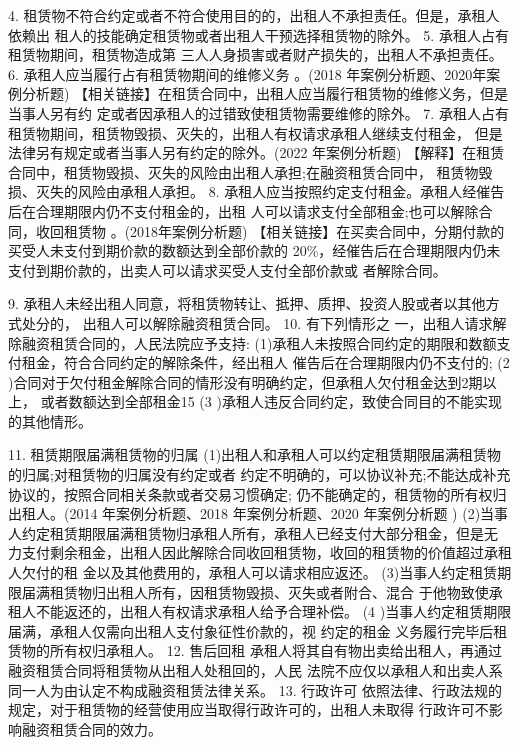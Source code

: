 \documentclass[UTF8,12pt]{ctexart}
\numberwithin{equation}{section} %
\numberwithin{figure}{section}
\numberwithin{table}{section}
\begin{document}
	4. 租赁物不符合约定或者不符合使用目的的，出租人不承担责任。但是，承租人依赖出 租人的技能确定租赁物或者出租人干预选择租赁物的除外。
	5. 承租人占有租赁物期间，租赁物造成第 三人人身损害或者财产损失的，出租人不承担责任。 6. 承租人应当履行占有租赁物期间的维修义务 。(2018 年案例分析题、2020年案例分析题)
	【相关链接】在租赁合同中，出租人应当履行租赁物的维修义务，但是当事人另有约 定或者因承租人的过错致使租赁物需要维修的除外。
	7. 承租人占有租赁物期间，租赁物毁损、灭失的，出租人有权请求承租人继续支付租金， 但是法律另有规定或者当事人另有约定的除外。(2022 年案例分析题)
	【解释】在租赁合同中，租赁物毁损、灭失的风险由出租人承担;在融资租赁合同中， 租赁物毁损、灭失的风险由承租人承担。
	8. 承租人应当按照约定支付租金。承租人经催告后在合理期限内仍不支付租金的，出租 人可以请求支付全部租金;也可以解除合同，收回租赁物 。(2018年案例分析题)
	【相关链接】在买卖合同中，分期付款的买受人未支付到期价款的数额达到全部价款的 20\%，经催告后在合理期限内仍未支付到期价款的，出卖人可以请求买受人支付全部价款或 者解除合同。
	
	9. 承租人未经出租人同意，将租赁物转让、抵押、质押、投资人股或者以其他方式处分的， 出租人可以解除融资租赁合同。
	10. 有下列情形之 一，出租人请求解除融资租赁合同的，人民法院应予支持: (1)承租人未按照合同约定的期限和数额支付租金，符合合同约定的解除条件，经出租人 催告后在合理期限内仍不支付的;
	(2 )合同对于欠付租金解除合同的情形没有明确约定，但承租人欠付租金达到2期以上， 或者数额达到全部租金15%
	(3 )承租人违反合同约定，致使合同目的不能实现的其他情形。
	
	11. 租赁期限届满租赁物的归属
	(1)出租人和承租人可以约定租赁期限届满租赁物的归属;对租赁物的归属没有约定或者 约定不明确的，可以协议补充;不能达成补充协议的，按照合同相关条款或者交易习惯确定; 仍不能确定的，租赁物的所有权归出租人。(2014 年案例分析题、2018 年案例分析题、2020 年案例分析题 )
	(2)当事人约定租赁期限届满租赁物归承租人所有，承租人已经支付大部分租金，但是无 力支付剩余租金，出租人因此解除合同收回租赁物，收回的租赁物的价值超过承租人欠付的租 金以及其他费用的，承租人可以请求相应返还。 (3)当事人约定租赁期限届满租赁物归出租人所有，因租赁物毁损、灭失或者附合、混合 于他物致使承租人不能返还的，出租人有权请求承租人给予合理补偿。
	(4 )当事人约定租赁期限届满，承租人仅需向出租人支付象征性价款的，视 约定的租金 义务履行完毕后租赁物的所有权归承租人。
	12. 售后回租 承租人将其自有物出卖给出租人，再通过融资租赁合同将租赁物从出租人处租回的，人民 法院不应仅以承租人和出卖人系同一人为由认定不构成融资租赁法律关系。
	13. 行政许可 依照法律、行政法规的规定，对于租赁物的经营使用应当取得行政许可的，出租人未取得 行政许可不影响融资租赁合同的效力。
	
\end{document}
